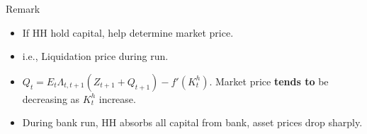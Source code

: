 \begin{frame}
    
    Remark
    \begin{itemize}
        \item If HH hold capital,  help determine market price. 
        \item i.e.,  Liquidation price during run. 
        \item $Q_t = E_t \Lambda_{t, t+1}(Z_{t+1} + Q_{t+1}) - f'(K^h_t)$. Market price {\bf tends to} be decreasing as $K^h_t$ increase.
        \item During bank run, HH absorbs all capital from bank, asset prices drop sharply. 
    \end{itemize}
\end{frame}